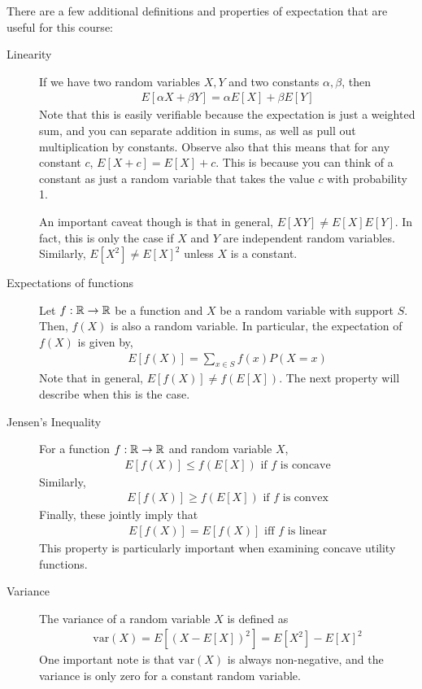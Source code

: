 There are a few additional definitions and properties of expectation that are useful for this course:
\begin{description}
    \item[Linearity] If we have two random variables $X, Y$ and two constants $\alpha, \beta$, then 
    \begin{align*}
        E[\alpha X + \beta Y] = \alpha E[X] + \beta E[Y]
    \end{align*} 
    Note that this is easily verifiable because the expectation is just a weighted sum, and you can separate addition in sums, as well as pull out multiplication by constants. Observe also that this means that for any constant $c$, $E[X + c] = E[X] + c$. This is because you can think of a constant as just a random variable that takes the value $c$ with probability 1. 

    An important caveat though is that in general, $E[XY] \neq E[X]E[Y]$. In fact, this is only the case if $X$ and $Y$ are independent random variables. Similarly, $E[X^2] \neq E[X]^2$ unless $X$ is a constant.

    \item[Expectations of functions] Let $f: \mathbb{R} \to \mathbb{R}$ be a function and $X$ be a random variable with support $S$. Then, $f(X)$ is also a random variable. In particular, the expectation of $f(X)$ is given by,
    \begin{align*}
        E[f(X)] = \sum_{x \in S} f(x) P(X = x)
    \end{align*} 
    Note that in general, $E[f(X)] \neq f(E[X])$. The next property will describe when this is the case.
    \item[Jensen's Inequality] For a function $f: \mathbb{R} \to \mathbb{R}$ and random variable $X$, 
    \begin{align*}
        E[f(X)] \leq f(E[X]) \text{ if $f$ is concave}
    \end{align*}
    Similarly,
    \begin{align*}
        E[f(X)] \geq f(E[X]) \text{ if $f$ is convex}
    \end{align*}
    Finally, these jointly imply that
    \begin{align*}
        E[f(X)] = E[f(X)] \text{ iff $f$ is linear}
    \end{align*}
    This property is particularly important when examining concave utility functions. 
    \item[Variance] The variance of a random variable $X$ is defined as
    \begin{align*}
        \text{var}(X) = E[(X - E[X])^2] = E[X^2] - E[X]^2
    \end{align*} 
    One important note is that $\text{var}(X)$ is always non-negative, and the variance is only zero for a constant random variable.
\end{description}

